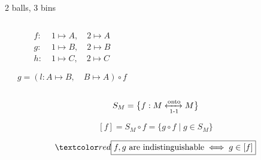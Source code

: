 \begin{frame}{}
  \begin{center}
    2 balls, 3 bins \qquad {}
  \end{center}

  \begin{columns}
    \pause
      \begin{center}
      \end{center}
      \begin{center}
        \pause
        \begin{align*}
          f:\; & 1 \mapsto A, \quad 2 \mapsto A \\[5pt]
          g:\; & 1 \mapsto B, \quad 2 \mapsto B \\[5pt]
          h:\; & 1 \mapsto C, \quad 2 \mapsto C
        \end{align*}

        \pause
        \[
          g = (l: A \mapsto B, \quad B \mapsto A) \circ f
        \]
      \end{center}
  \end{columns}
\end{frame}

\begin{frame}{}
  

  \pause
  \[
    S_M = \big\{ f: M \xleftrightarrow[\text{1-1}]{\text{onto}} M \big\}
  \]

  \pause
  \[
    [f] = S_M \circ f = \big\{g \circ f \mid g \in S_M \big\}
  \]

  \pause
  \[
    \red{\boxed{f, g \text{ are indistinguishable} \iff g \in [f]}}
  \]
\end{frame}

